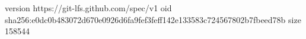 version https://git-lfs.github.com/spec/v1
oid sha256:e0dc0b483072d670e0926d6fa9fef3feff142e133583c724567802b7fbeed78b
size 158544
